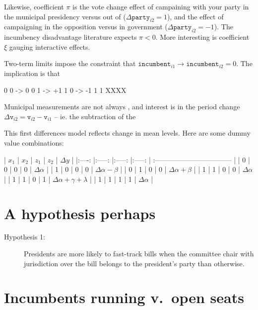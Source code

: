 \documentclass[letter,12pt]{article}
\newcommand{\vn}[1]{\vnform{#1}}      %
\newcommand{\vnform}[1]{\mathtt{#1}}  %
\begin{document}
Likewise, coefficient $\pi$ is the vote change effect of campaining with your party in the municipal presidency versus out of ($\Delta \vn{party}_{i2}=1$), and the effect of campaigning in the opposition versus in government ($\Delta \vn{party}_{i2}=-1$). The incumbency disadvantage literature expects $\pi < 0$. More interesting is coefficient $\xi$ gauging interactive effects.  


Two-term limits impose the constraint that $\vn{incumbent}_{i1} \rightarrow \vn{incumbent}_{i2}=0$. The implication is that 

0 0 ->  0
0 1 -> +1
1 0 -> -1
1 1 XXXX

Municipal measurements are not always , and interest is in the period change $\Delta \vn{v}_{i2} = \vn{v}_{i2} - \vn{v}_{i1}$ -- ie. the subtraction of the 


                                   This first differences model reflects change in mean levels. Here are some dummy value combinations:

| $x_1$ |  $x_2$ |  $z_1$ |  $z_2$ | $\Delta y$                         |
|:----: |:-----: |:-----: |:-----: | :--------------------------------- |
|     0 |      0 |      0 |      0 | $\Delta \alpha$                    |
|     1 |      0 |      0 |      0 | $\Delta \alpha  - \beta$           |
|     0 |      1 |      0 |      0 | $\Delta \alpha  + \beta$           |
|     1 |      1 |      0 |      0 | $\Delta \alpha$                    |
|     1 |      1 |      0 |      1 | $\Delta \alpha + \gamma + \lambda$ |
|     1 |      1 |      1 |      1 | $\Delta \alpha$                    |


\section{A hypothesis perhaps}

\begin{description}
  \item [Hypothesis 1:] Presidents are more likely to fast-track bills when the committee chair with jurisdiction over the bill  belongs to the president's party than otherwise.
\end{description}

\section{Incumbents running v.\ open seats}
\end{document}
